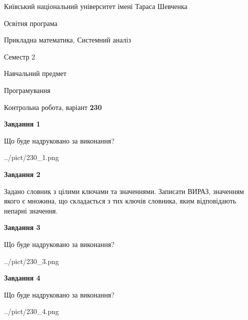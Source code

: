 \documentclass[12pt, ukrainian]{article}
\begin{document}
{{\begin {small}\par
{ \center  Київський національний університет імені Тараса Шевченка \par}
{\parbox {5 cm}{Освітня програма \hfill}{\parbox {8 cm}{Прикладна математика, Системний аналіз \hfill}}\parbox {5 cm}{\hfill Семестр 2}}\par
{\parbox {5 cm} {Навчальний предмет \hfill}\parbox {7 cm}{Програмування \hfill}\parbox {6cm}{\hfill}\par}\vspace{-7pt} \end{small}}{\center Контрольна робота, варіант  \No \textbf
{ 230 }\par}}
{
\begin {large}
{\begin {center}\textbf{Завдання 1}\end {center}}\par
Що буде надруковано за виконання?\par\par
\begin{center}
	{../pict/230_1.png}
\end{center}
\newpage

{\begin {center}\textbf{Завдання 2}\end {center}}\par
Задано словник  з цілими ключами та значеннями. Записати ВИРАЗ, значенням якого є множина, що складається  з тих ключів словника, яким відповідають непарні значення.\par
\newpage

{\begin {center}\textbf{Завдання 3}\end {center}}\par
Що буде надруковано за виконання?
\begin{center}
	{../pict/230_3.png}
\end{center}
\newpage

{\begin {center}\textbf{Завдання 4}\end {center}}\par
Що буде надруковано за виконання?\par
\begin{center}
	{../pict/230_4.png}
\end{center}
\newpage


\end{large}}
\end{document}
